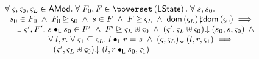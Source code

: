 \newpage	
\begin{lemma}[]\label{lem:amodWitness}
%
\[
\begin{array}{l}
	\for{\amod{}, \amod{0}, \amod{L} \in \AMods} \for{F_0, F \in \pset{\LState}} \for{s, s_0}\\
	\hspace*{0.2cm} s_0 \in F_0 \;\land\; F_0 \strictfences \amod{0} \;\land\; s \in F \;\land\; F \strictfences \amod{L} \;\land\;  \dom{\amod{L}} \disjoint \dom{\amod{0}} \implies \\
	\hspace*{0.5cm} \exsts{\amod{}', \fence{}'} s \composeL s_0 \in \fence{}' \;\land\; \fence{}' \strictfences \amod{L} \uplus \amod{0} \;\land\; 
	 \extendsAM{\amod{}', \amod{L} \uplus \amod{0}}{s_0}{s}{\amod{0}} \;\land\\
	 \hspace*{1.8cm}\for{l, r}\for{\amod{1} \subseteq \amod{L} } l \composeL r = s \;\land\; \extendsAM{\amod{}, \amod{L}}{l}{r}{\amod{1}} \implies\\
	 \hspace*{2cm}  \extendsAM{\amod{}', \amod{L} \uplus \amod{0}}{l}{r \composeL s_0}{\amod{1}}


\end{array}\]
\end{lemma}
